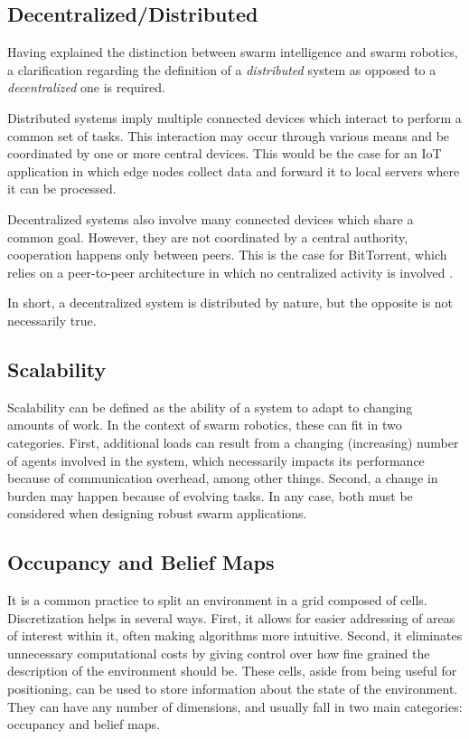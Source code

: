 \subsection{Decentralized/Distributed}
Having explained the distinction between swarm intelligence and swarm robotics, a clarification regarding the definition of a \textit{distributed} system as opposed to a \textit{decentralized} one is required.

Distributed systems imply multiple connected devices which interact to perform a common set of tasks. This interaction may occur through various means and be coordinated by one or more central devices. This would be the case for an \ac{IoT} application in which edge nodes collect data and forward it to local servers where it can be processed.

Decentralized systems also involve many connected devices which share a common goal. However, they are not coordinated by a central authority, cooperation happens only between peers. This is the case for BitTorrent, which relies on a peer-to-peer architecture in which no centralized activity is involved \cite{zhang2010unraveling}.

In short, a decentralized system is distributed by nature, but the opposite is not necessarily true.

\subsection{Scalability}
Scalability can be defined as the ability of a system to adapt to changing amounts of work. In the context of swarm robotics, these can fit in two categories. First, additional loads can result from a changing (increasing) number of agents involved in the system, which necessarily impacts its performance because of communication overhead, among other things. Second, a change in burden may happen because of evolving tasks. In any case, both must be considered when designing robust swarm applications.


\subsection{Occupancy and Belief Maps}
It is a common practice to split an environment in a grid composed of cells. Discretization helps in several ways. First, it allows for easier addressing of areas of interest within it, often making algorithms more intuitive. Second, it eliminates unnecessary computational costs by giving control over how fine grained the description of the environment should be.
These cells, aside from being useful for positioning, can be used to store information about the state of the environment. They can have any number of dimensions, and usually fall in two main categories: occupancy and belief maps.

